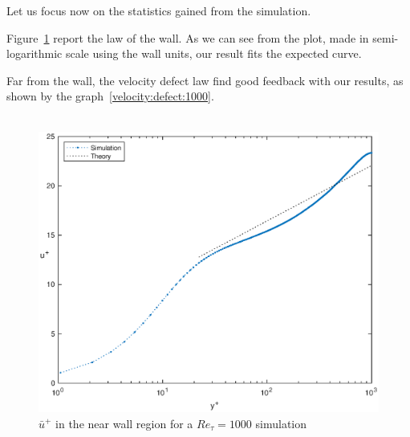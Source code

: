 Let us focus now on the statistics gained from the simulation.\par
Figure~\ref{loglaw:1000} report the law of the wall. As we can see from the plot, made in semi-logarithmic scale using the wall units, our result fits the expected curve.\par
Far from the wall, the velocity defect law find good feedback with our results, as shown by the graph~\ref{velocity:defect:1000}.\\~\par

\begin{figure}
\begin{center}
\includegraphics[scale=0.55]{grafici/loglaw_1000.eps}
\caption{$\bar{u}^{+}$ in the near wall region for a $Re_{\tau}=1000$ simulation}
\label{loglaw:1000}
\end{center} 
\end{figure}

